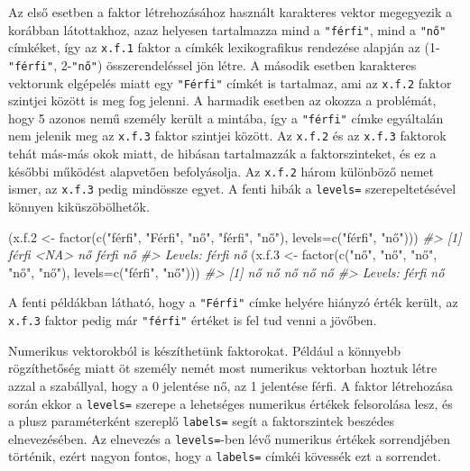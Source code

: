 \documentclass[
]{book}
\newenvironment{Shaded}{\begin{snugshade}}{\end{snugshade}}
\newcommand{\AttributeTok}[1]{\textcolor[rgb]{0.77,0.63,0.00}{#1}}
\newcommand{\CommentTok}[1]{\textcolor[rgb]{0.56,0.35,0.01}{\textit{#1}}}
\newcommand{\FloatTok}[1]{\textcolor[rgb]{0.00,0.00,0.81}{#1}}
\newcommand{\FunctionTok}[1]{\textcolor[rgb]{0.00,0.00,0.00}{#1}}
\newcommand{\NormalTok}[1]{#1}
\newcommand{\OtherTok}[1]{\textcolor[rgb]{0.56,0.35,0.01}{#1}}
\newcommand{\StringTok}[1]{\textcolor[rgb]{0.31,0.60,0.02}{#1}}
\begin{document}
Az első esetben a faktor létrehozásához használt karakteres vektor megegyezik a korábban látottakhoz, azaz helyesen tartalmazza mind a \texttt{"férfi"}, mind a \texttt{"nő"} címkéket, így az \texttt{x.f.1} faktor a címkék lexikografikus rendezése alapján az (1-\texttt{"férfi"}, 2-\texttt{"nő"}) összerendeléssel jön létre. A második esetben karakteres vektorunk elgépelés miatt egy \texttt{"Férfi"} címkét is tartalmaz, ami az \texttt{x.f.2} faktor szintjei között is meg fog jelenni. A harmadik esetben az okozza a problémát, hogy 5 azonos nemű személy került a mintába, így a \texttt{"férfi"} címke egyáltalán nem jelenik meg az \texttt{x.f.3} faktor szintjei között. Az \texttt{x.f.2} és az \texttt{x.f.3} faktorok tehát más-más okok miatt, de hibásan tartalmazzák a faktorszinteket, és ez a későbbi működést alapvetően befolyásolja. Az \texttt{x.f.2} három különböző nemet ismer, az \texttt{x.f.3} pedig mindössze egyet. A fenti hibák a \texttt{levels=} szerepeltetésével könnyen kiküszöbölhetők.

\begin{Shaded}
\begin{Highlighting}[]
\NormalTok{(x.f}\FloatTok{.2} \OtherTok{\textless{}{-}} \FunctionTok{factor}\NormalTok{(}\FunctionTok{c}\NormalTok{(}\StringTok{"férfi"}\NormalTok{, }\StringTok{"Férfi"}\NormalTok{, }\StringTok{"nő"}\NormalTok{, }\StringTok{"férfi"}\NormalTok{, }\StringTok{"nő"}\NormalTok{),}
                 \AttributeTok{levels=}\FunctionTok{c}\NormalTok{(}\StringTok{"férfi"}\NormalTok{, }\StringTok{"nő"}\NormalTok{)))   }
\CommentTok{\#\textgreater{} [1] férfi \textless{}NA\textgreater{}  nő    férfi nő   }
\CommentTok{\#\textgreater{} Levels: férfi nő}
\NormalTok{(x.f}\FloatTok{.3} \OtherTok{\textless{}{-}} \FunctionTok{factor}\NormalTok{(}\FunctionTok{c}\NormalTok{(}\StringTok{"nő"}\NormalTok{, }\StringTok{"nő"}\NormalTok{, }\StringTok{"nő"}\NormalTok{, }\StringTok{"nő"}\NormalTok{, }\StringTok{"nő"}\NormalTok{),}
                 \AttributeTok{levels=}\FunctionTok{c}\NormalTok{(}\StringTok{"férfi"}\NormalTok{, }\StringTok{"nő"}\NormalTok{)))}
\CommentTok{\#\textgreater{} [1] nő nő nő nő nő}
\CommentTok{\#\textgreater{} Levels: férfi nő}
\end{Highlighting}
\end{Shaded}

A fenti példákban látható, hogy a \texttt{"Férfi"} címke helyére hiányzó érték került, az \texttt{x.f.3} faktor pedig már \texttt{"férfi"} értéket is fel tud venni a jövőben.

Numerikus vektorokból is készíthetünk faktorokat. Például a könnyebb rögzíthetőség miatt öt személy nemét most numerikus vektorban hoztuk létre azzal a szabállyal, hogy a 0 jelentése nő, az 1 jelentése férfi. A faktor létrehozása során ekkor a \texttt{levels=} szerepe a lehetséges numerikus értékek felsorolása lesz, és a plusz paraméterként szereplő \texttt{labels=} segít a faktorszintek beszédes elnevezésében. Az elnevezés a \texttt{levels=}-ben lévő numerikus értékek sorrendjében történik, ezért nagyon fontos, hogy a \texttt{labels=} címkéi kövessék ezt a sorrendet.
\end{document}

